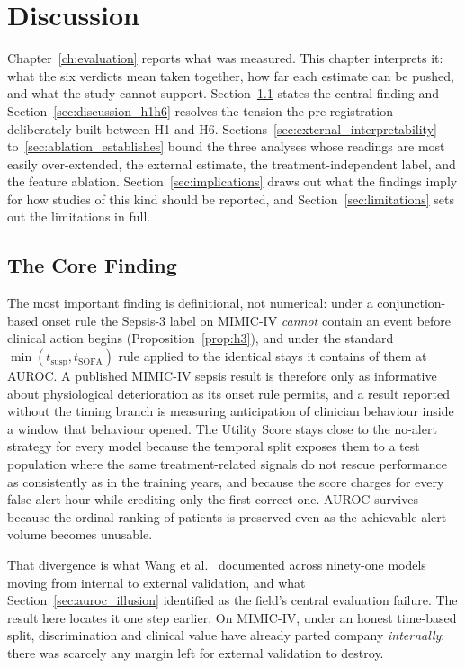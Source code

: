 \chapter{Discussion}
\label{ch:discussion}

Chapter~\ref{ch:evaluation} reports what was measured. This chapter interprets
it: what the six verdicts mean taken together, how far each estimate can be
pushed, and what the study cannot support. Section~\ref{sec:discussion_core}
states the central finding and Section~\ref{sec:discussion_h1h6} resolves the
tension the pre-registration deliberately built between H1 and H6.
Sections~\ref{sec:external_interpretability} to~\ref{sec:ablation_establishes}
bound the three analyses whose readings are most easily over-extended, the
external estimate, the treatment-independent label, and the feature ablation.
Section~\ref{sec:implications} draws out what the findings imply for how
studies of this kind should be reported, and
Section~\ref{sec:limitations} sets out the limitations in full.


\section{The Core Finding}
\label{sec:discussion_core}

The most important finding is definitional, not numerical: under a
conjunction-based onset rule the Sepsis-3 label on MIMIC-IV \emph{cannot}
contain an event before clinical action begins (Proposition~\ref{prop:h3}), and
under the standard $\min(t_{\text{susp}}, t_{\text{SOFA}})$ rule applied to the
identical stays it contains \pcPreTreatOnsetsVarF{} of them at
\pcPreTreatAurocPrimaryF{} AUROC. A published MIMIC-IV sepsis result is
therefore only as informative about physiological deterioration as its onset
rule permits, and a result reported without the timing branch is measuring
anticipation of clinician behaviour inside a window that behaviour opened.
The Utility Score stays close to the no-alert strategy for every model because
the temporal split exposes them to a test population where the same
treatment-related signals do not rescue performance as consistently as in the
training years, and because the score charges for every false-alert hour while
crediting only the first correct one. AUROC survives because the ordinal
ranking of patients is preserved even as the achievable alert volume becomes
unusable.

That divergence is what Wang et al.\ \cite{wang2025srpm} documented across
ninety-one models moving from internal to external validation, and what
Section~\ref{sec:auroc_illusion} identified as the field's central evaluation
failure. The result here locates it one step earlier. On MIMIC-IV, under an
honest time-based split, discrimination and clinical value have already parted
company \emph{internally}: there was scarcely any margin left for external
validation to destroy.



